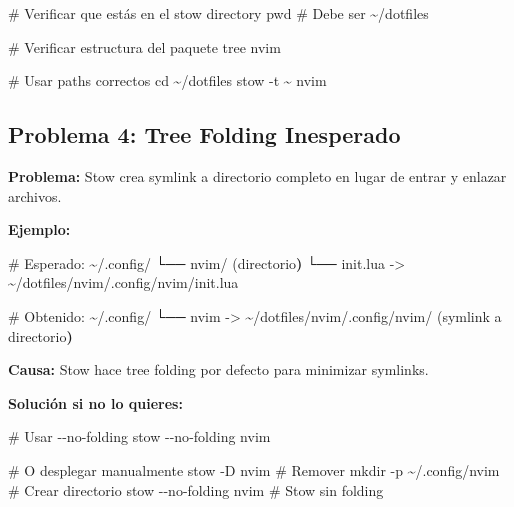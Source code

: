 \documentclass[
  doc,
  floatsintext,
  longtable,
  a4paper,
  nolmodern,
  notxfonts,
  notimes,
  12pt,
  colorlinks=true,linkcolor=blue,citecolor=blue,urlcolor=blue]{apa7}
\newenvironment{Shaded}{\begin{snugshade}}{\end{snugshade}}
\newcommand{\AttributeTok}[1]{\textcolor[rgb]{0.40,0.45,0.13}{#1}}
\newcommand{\BuiltInTok}[1]{\textcolor[rgb]{0.00,0.23,0.31}{#1}}
\newcommand{\CommentTok}[1]{\textcolor[rgb]{0.37,0.37,0.37}{#1}}
\newcommand{\ErrorTok}[1]{\textcolor[rgb]{0.68,0.00,0.00}{#1}}
\newcommand{\ExtensionTok}[1]{\textcolor[rgb]{0.00,0.23,0.31}{#1}}
\newcommand{\FunctionTok}[1]{\textcolor[rgb]{0.28,0.35,0.67}{#1}}
\newcommand{\KeywordTok}[1]{\textcolor[rgb]{0.00,0.23,0.31}{\textbf{#1}}}
\newcommand{\NormalTok}[1]{\textcolor[rgb]{0.00,0.23,0.31}{#1}}
\newcommand{\OperatorTok}[1]{\textcolor[rgb]{0.37,0.37,0.37}{#1}}
\begin{document}
\begin{Shaded}
\begin{Highlighting}[]
\CommentTok{\# Verificar que estás en el stow directory}
\BuiltInTok{pwd}  \CommentTok{\# Debe ser \textasciitilde{}/dotfiles}

\CommentTok{\# Verificar estructura del paquete}
\ExtensionTok{tree}\NormalTok{ nvim}

\CommentTok{\# Usar paths correctos}
\BuiltInTok{cd}\NormalTok{ \textasciitilde{}/dotfiles}
\ExtensionTok{stow} \AttributeTok{{-}t}\NormalTok{ \textasciitilde{} nvim}
\end{Highlighting}
\end{Shaded}

\subsection{Problema 4: Tree Folding
Inesperado}\label{problema-4-tree-folding-inesperado}

\textbf{Problema:} Stow crea symlink a directorio completo en lugar de
entrar y enlazar archivos.

\textbf{Ejemplo:}

\begin{Shaded}
\begin{Highlighting}[]
\CommentTok{\# Esperado:}
\ExtensionTok{\textasciitilde{}/.config/}
  \ExtensionTok{└──}\NormalTok{ nvim/ }\ErrorTok{(}\ExtensionTok{directorio}\KeywordTok{)}
      \ExtensionTok{└──}\NormalTok{ init.lua }\AttributeTok{{-}}\OperatorTok{\textgreater{}}\NormalTok{ \textasciitilde{}/dotfiles/nvim/.config/nvim/init.lua}

\CommentTok{\# Obtenido:}
\ExtensionTok{\textasciitilde{}/.config/}
  \ExtensionTok{└──}\NormalTok{ nvim }\AttributeTok{{-}}\OperatorTok{\textgreater{}}\NormalTok{ \textasciitilde{}/dotfiles/nvim/.config/nvim/ }\ErrorTok{(}\ExtensionTok{symlink}\NormalTok{ a directorio}\KeywordTok{)}
\end{Highlighting}
\end{Shaded}

\textbf{Causa:} Stow hace tree folding por defecto para minimizar
symlinks.

\textbf{Solución si no lo quieres:}

\begin{Shaded}
\begin{Highlighting}[]
\CommentTok{\# Usar {-}{-}no{-}folding}
\ExtensionTok{stow} \AttributeTok{{-}{-}no{-}folding}\NormalTok{ nvim}

\CommentTok{\# O desplegar manualmente}
\ExtensionTok{stow} \AttributeTok{{-}D}\NormalTok{ nvim  }\CommentTok{\# Remover}
\FunctionTok{mkdir} \AttributeTok{{-}p}\NormalTok{ \textasciitilde{}/.config/nvim  }\CommentTok{\# Crear directorio}
\ExtensionTok{stow} \AttributeTok{{-}{-}no{-}folding}\NormalTok{ nvim  }\CommentTok{\# Stow sin folding}
\end{Highlighting}
\end{Shaded}
\end{document}
